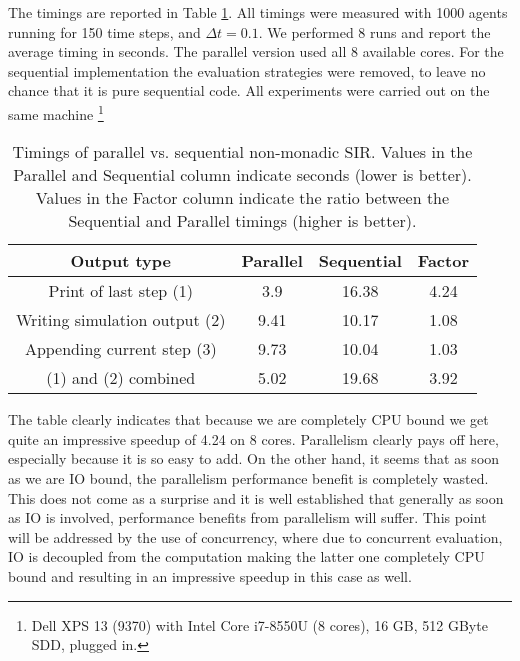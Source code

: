 The timings are reported in Table \ref{tab:parallel_nonmonadic_sir_timings}. All timings were measured with 1000 agents running for 150 time steps, and $\Delta t = 0.1$. We performed 8 runs and report the average timing in seconds. The parallel version used all 8 available cores. For the sequential implementation the evaluation strategies were removed, to leave no chance that it is pure sequential code. All experiments were carried out on the same machine \footnote{Dell XPS 13 (9370) with Intel Core i7-8550U (8 cores), 16 GB, 512 GByte SDD, plugged in.}

\begin{table}
	\centering
	\begin{tabular}{ c || c | c | c }
		Output type                   & Parallel & Sequential & Factor \\ \hline
		Print of last step (1)        & 3.9      & 16.38      & 4.24 \\ \hline
		Writing simulation output (2) & 9.41     & 10.17      & 1.08 \\ \hline
		Appending current step (3)    & 9.73     & 10.04      & 1.03 \\ \hline
		(1) and (2) combined	          & 5.02     & 19.68      & 3.92 \\ \hline
	\end{tabular}
	
	\caption[Timings of parallel vs. sequential non-monadic SIR]{Timings of parallel vs. sequential non-monadic SIR. Values in the Parallel and Sequential column indicate seconds (lower is better). Values in the Factor column indicate the ratio between the Sequential and Parallel timings (higher is better).}
	\label{tab:parallel_nonmonadic_sir_timings}
\end{table}

The table clearly indicates that because we are completely CPU bound we get quite an impressive speedup of 4.24 on 8 cores. Parallelism clearly pays off here, especially because it is so easy to add. On the other hand, it seems that as soon as we are IO bound, the parallelism performance benefit is completely wasted. This does not come as a surprise and it is well established that generally as soon as IO is involved, performance benefits from parallelism will suffer. This point will be addressed by the use of concurrency, where due to concurrent evaluation, IO is decoupled from the computation making the latter one completely CPU bound and resulting in an impressive speedup in this case as well.

